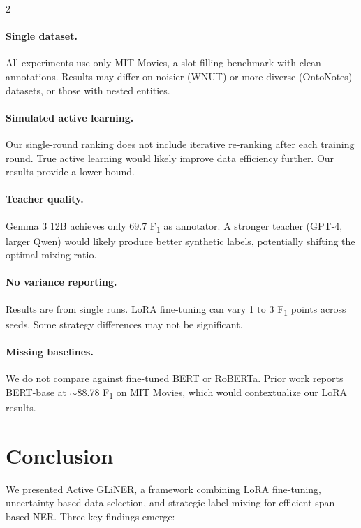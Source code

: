 \documentclass[11pt]{article}
\newcommand{\fone}{F\textsubscript{1}}
\newcommand{\method}{Active GLiNER}
\begin{document}
\begin{multicols}{2}
\paragraph{Single dataset.} All experiments use only MIT Movies, a slot-filling benchmark with clean annotations. Results may differ on noisier (WNUT) or more diverse (OntoNotes) datasets, or those with nested entities.

\paragraph{Simulated active learning.} Our single-round ranking does not include iterative re-ranking after each training round. True active learning would likely improve data efficiency further. Our results provide a lower bound.

\paragraph{Teacher quality.} Gemma 3 12B achieves only 69.7 \fone{} as annotator. A stronger teacher (GPT-4, larger Qwen) would likely produce better synthetic labels, potentially shifting the optimal mixing ratio.

\paragraph{No variance reporting.} Results are from single runs. LoRA fine-tuning can vary 1 to 3 \fone{} points across seeds. Some strategy differences may not be significant.

\paragraph{Missing baselines.} We do not compare against fine-tuned BERT or RoBERTa. Prior work reports BERT-base at ${\sim}$88.78 \fone{} on MIT Movies, which would contextualize our LoRA results.

\section{Conclusion}

We presented \method{}, a framework combining LoRA fine-tuning, uncertainty-based data selection, and strategic label mixing for efficient span-based NER. Three key findings emerge:


\end{multicols}
\end{document}
